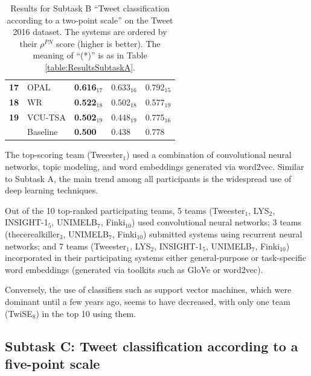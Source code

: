 \documentclass[11pt,letterpaper]{article}
\newif\ifdraft
\newcommand{\fabrizio}[1]{\ifdraft{\textcolor{cyan}{[Fabrizio]: {#1}}}\else{\vspace{0ex}}\fi}
\begin{document}
\begin{table}[htb]
\begin{small}
{\begin{tabular}{|c|l|l|l|l|}
      \bf 17 & OPAL & \bf 0.616$_{17}$ & 0.633$_{16}$ & 0.792$_{15}$ \\
      \bf 18 & WR & \bf 0.522$_{18}$ & 0.502$_{18}$ & 0.577$_{19}$ \\
      \bf 19 & VCU-TSA & \bf 0.502$_{19}$ & 0.448$_{19}$ & 0.775$_{16}$ \\
      \hline\rule[0ex]{0mm}{2ex} 
      & Baseline & \bf 0.500 & 0.438 & 0.778\\
      \hline
    \end{tabular}
    } \medskip
 \caption{\label{table:ResultsSubtaskB} Results for Subtask B ``Tweet classification according to a two-point scale'' on the Tweet 2016 dataset. The systems are ordered by their $\rho^{PN} $ score (higher is better). The meaning of ``(*)'' is as in Table \ref{table:ResultsSubtaskA}.
 }
\end{small}
\end{table}
\renewcommand{\baselinestretch}{1.00}

The top-scoring team (Tweester$_{1}$) used a combination of
convolutional neural networks, topic modeling, and word embeddings
generated via word2vec. Similar to Subtask A, the main trend among all
participants is the widespread use of deep learning techniques. 

Out of the 10 top-ranked participating teams, 5 teams (Tweester$_{1}$, LYS$_{2}$,
INSIGHT-1$_{5}$, UNIMELB$_{7}$, Finki$_{10}$) used convolutional neural networks;
3 teams (thecerealkiller$_{3}$, UNIMELB$_{7}$, Finki$_{10}$) submitted systems using
recurrent neural networks; and 7 teams (Tweester$_{1}$, LYS$_{2}$,
INSIGHT-1$_{5}$, UNIMELB$_{7}$, Finki$_{10}$) incorporated in their participating systems either
general-purpose or task-specific word embeddings (generated via toolkits such as GloVe or word2vec). 

Conversely, the use of classifiers such as support vector machines, which were dominant until a
few years ago, seems to have decreased, with only one team (TwiSE$_{8}$)
in the top 10 using them.


\subsection{Subtask C: Tweet classification according to a five-point
scale}
\label{sec:4Cdiscussion}
\end{document}
